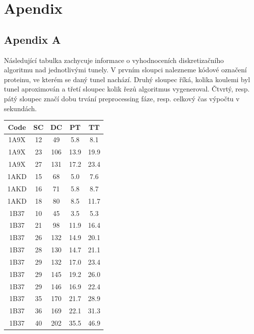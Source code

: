 \chapter*{Apendix}

\section*{Apendix A}
Následující tabulka zachycuje informace o vyhodnoceních diskretizačního
algoritmu nad jednotlivými tunely. V prvním sloupci nalezneme kódové označení
proteinu, ve kterém se daný tunel nachází. Druhý sloupec říká, kolika koulemi byl
tunel aproximován a třetí sloupec kolik řezů algoritmus vygeneroval. Čtvrtý,
resp. pátý sloupec značí dobu trvání preprocessing fáze, resp. celkový čas výpočtu
v sekundách.
\begin{table}[htbp]
    \centering
    \fontsize{9}{11}\selectfont
    \begin{tabular}{||c | c c c c||}
        \hline
        Code & SC & DC & PT & TT \\ [0.5ex]
        \hline\hline
        1A9X & 12 & 49 & 5.8 & 8.1 \\
        \hline
        1A9X & 23 & 106 & 13.9 & 19.9 \\
        \hline
        1A9X & 27 & 131 & 17.2 & 23.4 \\
        \hline
        1AKD & 15 & 68 & 5.0 & 7.6 \\
        \hline
        1AKD & 16 & 71 & 5.8 & 8.7 \\
        \hline
        1AKD & 18 & 80 & 8.5 & 11.7 \\
        \hline
        1B37 & 10 & 45 & 3.5 & 5.3 \\
        \hline
        1B37 & 21 & 98 & 11.9 & 16.4 \\
        \hline
        1B37 & 26 & 132 & 14.9 & 20.1 \\
        \hline
        1B37 & 28 & 130 & 14.7 & 21.1 \\
        \hline
        1B37 & 29 & 132 & 17.0 & 23.4 \\
        \hline
        1B37 & 29 & 145 & 19.2 & 26.0 \\
        \hline
        1B37 & 29 & 146 & 16.9 & 22.4 \\
        \hline
        1B37 & 35 & 170 & 21.7 & 28.9 \\
        \hline
        1B37 & 36 & 169 & 22.1 & 31.3 \\
        \hline
        1B37 & 40 & 202 & 35.5 & 46.9 \\

\end{tabular}
\end{table}
